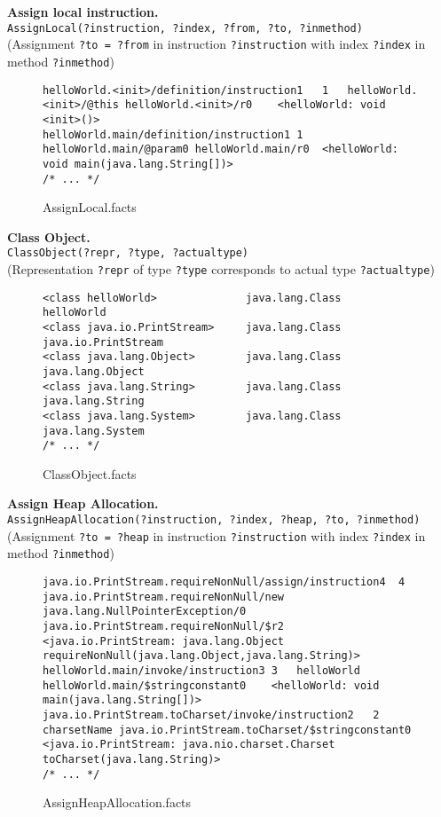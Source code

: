 \documentclass{dithesis}
\begin{document}
        \textbf{Assign local instruction.}\\
        \texttt{AssignLocal(?instruction, ?index, ?from, ?to, ?inmethod)}\\
        (Assignment \texttt{?to = ?from} in instruction \texttt{?instruction} with index \texttt{?index} in method \texttt{?inmethod})
        \begin{figure}[H]
\begin{lstlisting}
helloWorld.<init>/definition/instruction1   1   helloWorld.<init>/@this helloWorld.<init>/r0    <helloWorld: void <init>()>
helloWorld.main/definition/instruction1 1   helloWorld.main/@param0 helloWorld.main/r0  <helloWorld: void main(java.lang.String[])>
/* ... */
\end{lstlisting}
\caption{AssignLocal.facts}
        \end{figure}


        \textbf{Class Object.}\\
        \texttt{ClassObject(?repr, ?type, ?actualtype)}\\
        (Representation \texttt{?repr} of type \texttt{?type} corresponds to actual type \texttt{?actualtype})
        \begin{figure}[H]
\begin{lstlisting}
<class helloWorld>              java.lang.Class     helloWorld
<class java.io.PrintStream>     java.lang.Class     java.io.PrintStream
<class java.lang.Object>        java.lang.Class     java.lang.Object
<class java.lang.String>        java.lang.Class     java.lang.String
<class java.lang.System>        java.lang.Class     java.lang.System
/* ... */
\end{lstlisting}
\caption{ClassObject.facts}
        \end{figure}


        \textbf{Assign Heap Allocation.}\\
        \texttt{AssignHeapAllocation(?instruction, ?index, ?heap, ?to, ?inmethod)}\\
        (Assignment \texttt{?to = ?heap} in instruction \texttt{?instruction} with index \texttt{?index} in method \texttt{?inmethod})
        \begin{figure}[H]
\begin{lstlisting}
java.io.PrintStream.requireNonNull/assign/instruction4  4   java.io.PrintStream.requireNonNull/new java.lang.NullPointerException/0 java.io.PrintStream.requireNonNull/$r2  <java.io.PrintStream: java.lang.Object requireNonNull(java.lang.Object,java.lang.String)>
helloWorld.main/invoke/instruction3 3   helloWorld  helloWorld.main/$stringconstant0    <helloWorld: void main(java.lang.String[])>
java.io.PrintStream.toCharset/invoke/instruction2   2   charsetName java.io.PrintStream.toCharset/$stringconstant0  <java.io.PrintStream: java.nio.charset.Charset toCharset(java.lang.String)>
/* ... */
\end{lstlisting}
\caption{AssignHeapAllocation.facts}
        \end{figure}
\end{document}
